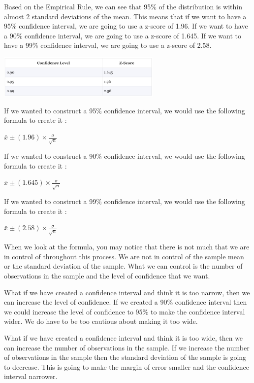 \documentclass[
  letterpaper,
  DIV=11,
  numbers=noendperiod]{scrreprt}
\begin{document}
Based on the Empirical Rule, we can see that 95\% of the distribution is
within almost 2 standard deviations of the mean. This means that if we
want to have a 95\% confidence interval, we are going to use a z-score
of 1.96. If we want to have a 90\% confidence interval, we are going to
use a z-score of 1.645. If we want to have a 99\% confidence interval,
we are going to use a z-score of 2.58.

\includegraphics[width=0.6\textwidth,height=\textheight]{./images/EPCI_2.jpg}

If we wanted to construct a 95\% confidence interval, we would use the
following formula to create it :

\(\displaystyle{\bar{x} \pm (1.96) \times \frac{\sigma}{\sqrt{n}}}\)

If we wanted to construct a 90\% confidence interval, we would use the
following formula to create it :

\(\displaystyle{\bar{x} \pm (1.645) \times \frac{\sigma}{\sqrt{n}}}\)

If we wanted to construct a 99\% confidence interval, we would use the
following formula to create it :

\(\displaystyle{\bar{x} \pm (2.58) \times \frac{\sigma}{\sqrt{n}}}\)

When we look at the formula, you may notice that there is not much that
we are in control of throughout this process. We are not in control of
the sample mean or the standard deviation of the sample. What we can
control is the number of observations in the sample and the level of
confidence that we want.

What if we have created a confidence interval and think it is too
narrow, then we can increase the level of confidence. If we created a
90\% confidence interval then we could increase the level of confidence
to 95\% to make the confidence interval wider. We do have to be too
cautious about making it too wide.

What if we have created a confidence interval and think it is too wide,
then we can increase the number of observations in the sample. If we
increase the number of observations in the sample then the standard
deviation of the sample is going to decrease. This is going to make the
margin of error smaller and the confidence interval narrower.
\end{document}
